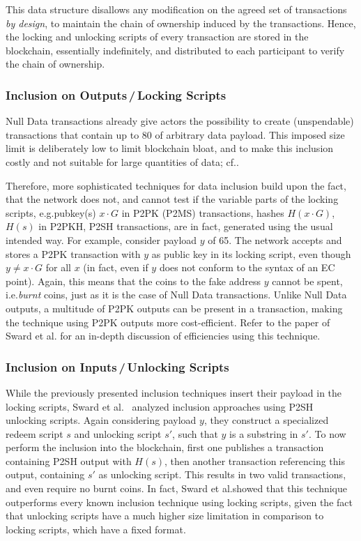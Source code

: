 \documentclass[a4paper,11pt,titlepage]{scrbook}
\begin{document}
This data structure disallows any modification on the agreed set of transactions \emph{by design}, 
to maintain the chain of ownership induced by the transactions.
Hence, the locking and unlocking scripts of every transaction are stored in the blockchain, essentially indefinitely, and distributed to each participant to verify the chain of ownership.

\subsubsection*{Inclusion on Outputs\,/\,Locking Scripts}

Null Data transactions already give actors the possibility to create (unspendable) transactions that contain up to \SI{80}{\byte} of arbitrary data payload. This imposed size limit is deliberately low to limit blockchain bloat, and to make this inclusion costly and not suitable for large quantities of data; cf.\@ \cite[155--156]{antonopoulos_mastering_2017}.

Therefore, more sophisticated techniques for data inclusion build upon the fact, that the network does not, and cannot test if the variable parts of the locking scripts, e.g.\@ pubkey(s) $x\cdot G$ in P2PK (P2MS) transactions, hashes $H(x\cdot G)$, $H(s)$ in P2PKH, P2SH transactions, are in fact, generated using the usual intended way.
For example, consider payload $y$ of \SI{65}{\byte}.
The network accepts and stores a P2PK transaction with $y$ as  public key in its locking script, even though $y\neq x\cdot G$ for all $x$ (in fact, even if $y$ does not conform to the syntax of an EC point).
Again, this means that the coins  to the fake address $y$ cannot be spent, i.e.\@ \emph{burnt} coins, just as it is the case of Null Data transactions.
Unlike Null Data outputs, a multitude of P2PK outputs can be present in a transaction, making the technique using P2PK outputs more cost-efficient.
Refer to the paper of Sward et al.\@ \cite{sward_data_2018} for an in-depth discussion of efficiencies using this technique.

\subsubsection*{Inclusion on Inputs\,/\,Unlocking Scripts}
While the previously presented inclusion techniques insert their payload in the locking scripts, Sward et al.~\cite{sward_data_2018} analyzed inclusion approaches using P2SH unlocking scripts.
Again considering payload $y$, they construct a specialized redeem script $s$ and unlocking script $s'$, 
such that $y$ is a substring in $s'$.
To now perform the inclusion into the blockchain, first one publishes a transaction containing P2SH output with $H(s)$, then another transaction referencing this output, containing $s'$ as unlocking script.
This results in two valid transactions, and even require no burnt coins.
In fact, Sward et al.\@ showed that this technique outperforms every known inclusion technique using locking scripts, given the fact that unlocking scripts have a much higher size limitation in comparison to locking scripts, which have a fixed format.
\end{document}

